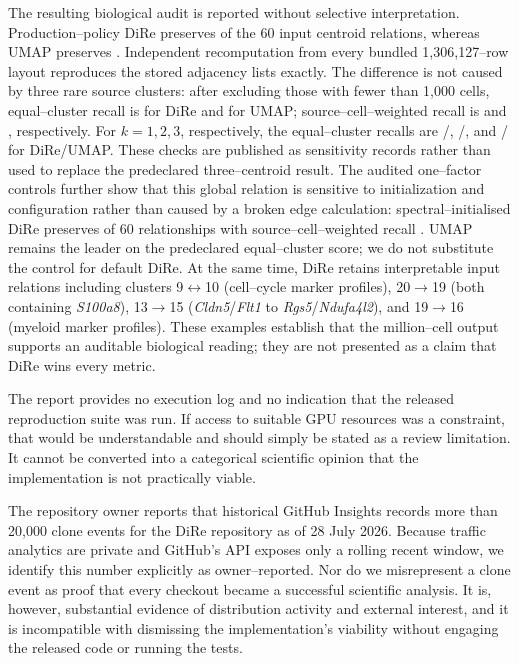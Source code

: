 \documentclass[11pt]{article}
\begin{document}
The resulting biological audit is reported without selective interpretation.
Production--policy DiRe preserves \TenxDireAutoAdjacencyPreserved{} of the 60
input centroid relations, whereas UMAP preserves
\TenxCumlUmapAdjacencyPreserved{}. Independent recomputation from every bundled
1,306,127--row layout reproduces the stored adjacency lists exactly. The
difference is not caused by three rare source clusters: after excluding those
with fewer than 1,000 cells, equal--cluster recall is
\TenxDireAutoAdjacencyFilteredEqual{} for DiRe and
\TenxCumlUmapAdjacencyFilteredEqual{} for UMAP; source--cell--weighted recall
is \TenxDireAutoAdjacencyCellWeighted{} and
\TenxCumlUmapAdjacencyCellWeighted{}, respectively. For $k=1,2,3$,
respectively, the equal--cluster recalls are
\TenxDireAutoAdjacencyKOne{}/\TenxCumlUmapAdjacencyKOne{},
\TenxDireAutoAdjacencyKTwo{}/\TenxCumlUmapAdjacencyKTwo{}, and
\TenxDireAutoAdjacencyKThree{}/\TenxCumlUmapAdjacencyKThree{} for DiRe/UMAP.
These checks are published as sensitivity records rather than used to replace
the predeclared three--centroid result. The audited one--factor controls further
show that this global relation is sensitive to initialization and configuration
rather than caused by a broken edge calculation: spectral--initialised DiRe
preserves \TenxDireSpectralAdjacencyPreserved{} of 60 relationships with
source--cell--weighted recall \TenxDireSpectralAdjacencyCellWeighted{}.
UMAP remains the leader on the predeclared equal--cluster score; we do not
substitute the control for default DiRe. At the same time, DiRe retains
interpretable input
relations including clusters 9$\leftrightarrow$10 (cell--cycle marker
profiles), 20$\rightarrow$19 (both containing \textit{S100a8}),
13$\rightarrow$15 (\textit{Cldn5}/\textit{Flt1} to
\textit{Rgs5}/\textit{Ndufa4l2}), and 19$\rightarrow$16 (myeloid marker
profiles). These examples establish that the million--cell output supports an
auditable biological reading; they are not presented as a claim that DiRe
wins every metric.

The report provides no execution log and no indication that the released
reproduction suite was run. If access to suitable GPU resources was a
constraint, that would be understandable and should simply be stated as a
review limitation. It cannot be converted into a categorical scientific
opinion that the implementation is not practically viable.

The repository owner reports that historical GitHub Insights records more
than 20,000 clone events for the DiRe repository as of 28 July 2026. Because
traffic analytics are private and GitHub's API exposes only a rolling recent
window, we identify this number explicitly as owner--reported. Nor do we
misrepresent a clone event as proof that every checkout became a successful
scientific analysis. It is, however, substantial evidence of distribution
activity and external interest, and it is incompatible with dismissing the
implementation's viability without engaging the released code or running the
tests.
\end{document}
